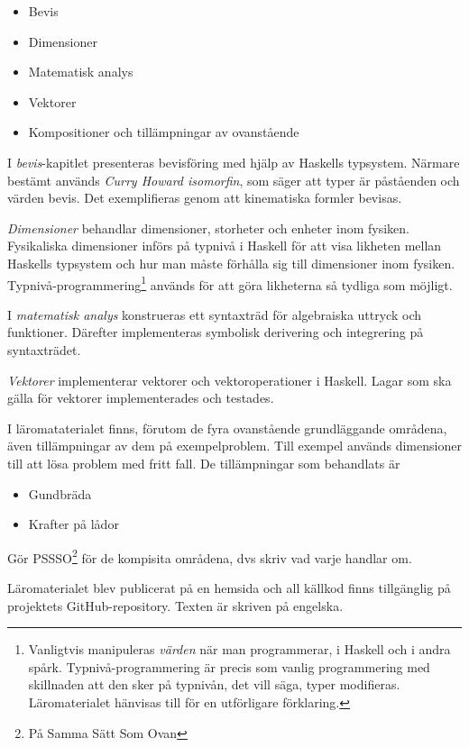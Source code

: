 \begin{draft}
\begin{itemize}
  \item Bevis
  \item Dimensioner
  \item Matematisk analys
  \item Vektorer
  \item Kompositioner och tillämpningar av ovanstående
\end{itemize}

I \textit{bevis}-kapitlet presenteras bevisföring med hjälp av Haskells typsystem. Närmare bestämt används \textit{Curry Howard isomorfin}, som säger att typer är påståenden och värden bevis.\cite{chi} Det exemplifieras genom att kinematiska formler bevisas. 

\textit{Dimensioner} behandlar dimensioner, storheter och enheter inom fysiken. Fysikaliska dimensioner införs på typnivå i Haskell för att visa likheten mellan Haskells typsystem och hur man måste förhålla sig till dimensioner inom fysiken. Typnivå-programmering\footnote{Vanligtvis manipuleras \textit{värden} när man programmerar, i Haskell och i andra spårk. Typnivå-programmering är precis som vanlig programmering med skillnaden att den sker på typnivån, det vill säga, typer modifieras. Läromaterialet \cite{LYAP} hänvisas till för en utförligare förklaring.} används för att göra likheterna så tydliga som möjligt.

I \textit{matematisk analys} konstrueras ett syntaxträd för algebraiska uttryck och funktioner. Därefter implementeras symbolisk derivering och integrering på syntaxträdet.

\textit{Vektorer} implementerar vektorer och vektoroperationer i Haskell. Lagar som ska gälla för vektorer implementerades och testades.

I läromataterialet finns, förutom de fyra ovanstående grundläggande områdena,
även tillämpningar av dem på exempelproblem. Till exempel används dimensioner
till att lösa problem med fritt fall. De tillämpningar som behandlats är

\begin{itemize}
  \item Gundbräda
  \item Krafter på lådor
\end{itemize}

Gör PSSSO\footnote{På Samma Sätt Som Ovan} för de kompisita områdena, dvs skriv vad varje handlar om.

Läromaterialet blev publicerat på en hemsida\cite{LYAP} och all källkod finns
tillgänglig på projektets GitHub-repository.\cite{LYAP_repo} Texten är skriven
på engelska.

\end{draft}

